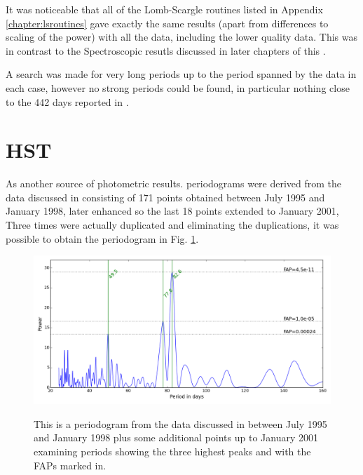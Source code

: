 It was noticeable that all of the Lomb-Scargle routines listed in Appendix \ref{chapter:lsroutines} gave exactly
the same results (apart from differences to scaling of the power) with all the {\asas} data, including the lower quality
data. This was in contrast to the Spectroscopic resutls discussed in later chapters of this \paperorthesis.

A search was made for very long periods up to the period spanned by the data in each case, however no strong periods
could be found, in particular nothing close to the 442 days reported in \citet{cincunegui07}.

\section{HST}
\protect\label{section:hst}

As another source of photometric results. periodograms were derived from the  {\hst} data discussed in
\citealt{benedict92,benedict98} consisting of 171 points obtained between July 1995 and January 1998, later enhanced so
the last 18 points extended to January 2001, Three times were actually duplicated and eliminating the duplications, it
was possible to obtain the periodogram in Fig. \ref{fig:hstb4min}.

\begin{figure}[!htbp]
\begin{center}
\includegraphics[scale=0.50]{Figures/hstb4min.png} \\
\end{center}
\caption{This is a periodogram from the {\hst} data discussed in \citet{benedict98} between July 1995 and January 1998 plus some additional
  points up to January 2001 examining periods showing the three highest peaks and with the FAPs marked in.}
\protect\label{fig:hstb4min}
\end{figure}

